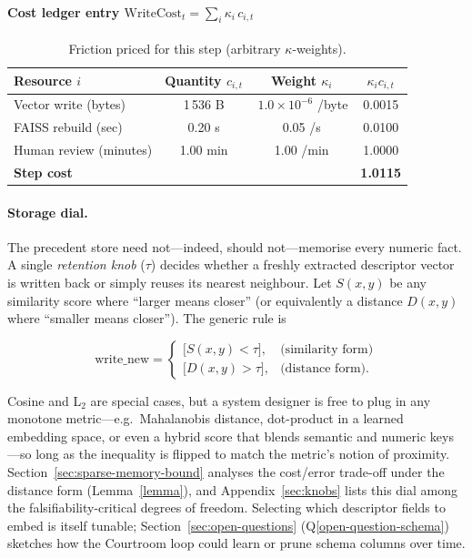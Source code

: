 \documentclass[11pt]{article}
\begin{document}
\paragraph{Cost ledger entry $\displaystyle\text{WriteCost}_t=\sum_i\kappa_i\,c_{i,t}$}

\begin{table}[h]
\centering\footnotesize
\begin{tabular}{@{}lccc@{}}
\toprule
Resource $i$ & Quantity $c_{i,t}$ & Weight $\kappa_i$ & $\kappa_i c_{i,t}$ \\ \midrule
Vector write (bytes)      & 1\,536 B & \,$1.0\times10^{-6}$ /byte & 0.0015 \\
FAISS rebuild (sec)       & 0.20 s   & 0.05 /s                 & 0.0100 \\
Human review (minutes)    & 1.00 min & 1.00 /min               & 1.0000 \\ \midrule
\textbf{Step cost}  & & &  \textbf{1.0115} \\ \bottomrule
\end{tabular}
\caption{Friction priced for this step (arbitrary $\kappa$-weights).}
\end{table}

\paragraph{Storage dial.}
The precedent store need not—indeed, should not—memorise every numeric
fact. A single \emph{retention knob} (\(\tau\)) decides whether a freshly
extracted descriptor vector is written back or simply reuses its nearest
neighbour. Let \(S(x,y)\) be any similarity score where “larger means
closer” (or equivalently a distance \(D(x,y)\) where “smaller means
closer”). The generic rule is

\[
\text{write\_new} =
\begin{cases}
\bigl[S(x,y) < \tau\bigr], & \text{(similarity form)}\\[4pt]
\bigl[D(x,y) > \tau\bigr], & \text{(distance form)}.
\end{cases}
\]

Cosine and L$_2$ are special cases, but a system designer is free to
plug in any monotone metric—e.g.\ Mahalanobis distance, dot-product in a
learned embedding space, or even a hybrid score that blends semantic and
numeric keys—so long as the inequality is flipped to match the
metric's notion of proximity. Section~\ref{sec:sparse-memory-bound} analyses the cost/error trade-off
under the distance form (Lemma~\ref{lemma}), and Appendix~\ref{sec:knobs} lists this dial
among the falsifiability-critical degrees of freedom. Selecting which descriptor 
fields to embed is itself tunable; Section~\ref{sec:open-questions} (Q\ref{open-question-schema}) sketches how the Courtroom loop 
could learn or prune schema columns over time.
\end{document}
